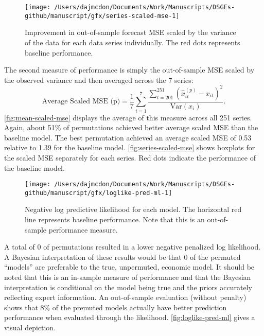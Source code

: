 \documentclass[11pt]{article}
\renewcommand{\hat}{\widehat}
\begin{document}
\begin{figure}[t]

{\centering \texttt{[image: /Users/dajmcdon/Documents/Work/Manuscripts/DSGEs-github/manuscript/gfx/series-scaled-mse-1]} 

}

\caption{Improvement in out-of-sample forecast MSE scaled by the variance of the data for each data series individually. The red dots represents baseline performance.}\label{fig:series-scaled-mse}
\end{figure}

The second measure of performance is simply the out-of-sample MSE scaled
by the observed variance and then averaged across the 7 series:
\begin{equation}
  \mbox{Average Scaled MSE (p)} = \frac{1}{7} \sum_{i=1}^7
  \frac{\sum_{t=201}^{251} (\hat{x}_{it}^{(p)}-x_{it})^2}
    {\mbox{Var}(x_i)}.
\end{equation} \autoref{fig:mean-scaled-mse} displays the average of
this measure across all 251 series. Again, about 51\% of permutations
achieved better average scaled MSE than the baseline model. The best
permutation achieved an average scaled MSE of 0.53 relative to 1.39 for
the baseline model. \autoref{fig:series-scaled-mse} shows boxplots for
the scaled MSE separately for each series. Red dots indicate the
performance of the baseline model.

\begin{figure}[t]

{\centering \texttt{[image: /Users/dajmcdon/Documents/Work/Manuscripts/DSGEs-github/manuscript/gfx/loglike-pred-ml-1]} 

}

\caption{Negative log predictive likelihood for each model. The horizontal red line represents baseline performance. Note that this is an out-of-sample performance measure.}\label{fig:loglike-pred-ml}
\end{figure}

A total of 0 of permutations resulted in a lower negative penalized log
likelihood. A Bayesian interpretation of these results would be that 0
of the permuted ``models'' are preferable to the true, unpermuted,
economic model. It should be noted that this is an in-sample measure of
performance and that the Bayesian interpretation is conditional on the
model being true and the priors accurately reflecting expert
information. An out-of-sample evaluation (without penalty) shows that
8\% of the premuted models actually have better prediction performance
when evaluated through the likelihood. \autoref{fig:loglike-pred-ml}
gives a visual depiction.
\end{document}
